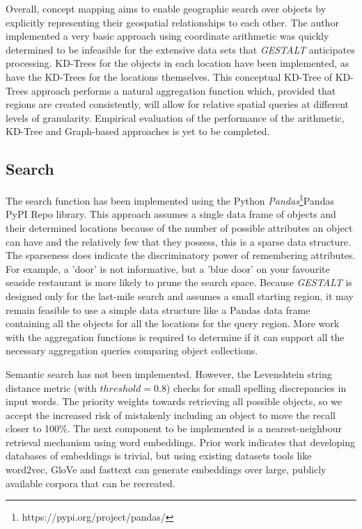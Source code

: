 Overall, concept mapping aims to enable geographic search over objects by explicitly representing their geospatial relationships to each other. 
The author implemented a very basic approach using coordinate arithmetic was quickly determined to be infeasible for the extensive data sets that \textit{GESTALT} anticipates processing. 
KD-Trees for the objects in each location have been implemented, as have the KD-Trees for the locations themselves. 
This conceptual KD-Tree of KD-Trees approach performs a natural aggregation function which, provided that regions are created consistently, will allow for relative spatial queries at different levels of granularity. 
Empirical evaluation of the performance of the arithmetic, KD-Tree and Graph-based approaches is yet to be completed. 

\subsection{Search}
The search function has been implemented using the Python \textit{Pandas}\footnote{https://pypi.org/project/pandas/}{Pandas PyPI Repo} library. 
This approach assumes a single data frame of objects and their determined locations because of the number of possible attributes an object can have and the relatively few that they possess, this is a sparse data structure. 
The sparseness does indicate the discriminatory power of remembering attributes. For example, a 'door' is not informative, but a 'blue door' on your favourite seaside restaurant is more likely to prune the search space. 
Because \textit{GESTALT} is designed only for the last-mile search and assumes a small starting region, it may remain feasible to use a simple data structure like a Pandas data frame containing all the objects for all the locations for the query region. 
More work with the aggregation functions is required to determine if it can support all the necessary aggregation queries comparing object collections. 

Semantic search has not been implemented. However, the Levenshtein string distance metric (with $threshold = 0.8$) checks for small spelling discrepancies in input words. The priority weights towards retrieving all possible objects, so we accept the increased risk of mistakenly including an object to move the recall closer to 100\%. The next component to be implemented is a nearest-neighbour retrieval mechanism using word embeddings. Prior work indicates that developing databases of embeddings is trivial\cite{Mueller2012}, but using existing datasets tools like word2vec, GloVe and fasttext can generate embeddings over large, publicly available corpora that can be recreated. 

